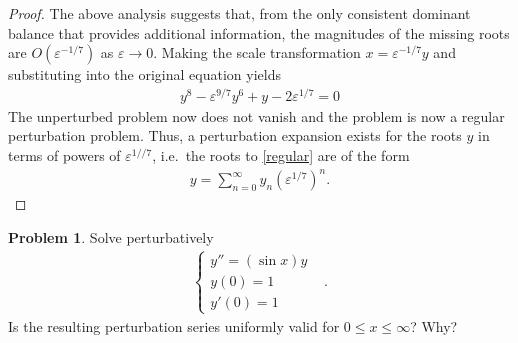 \documentclass[12pt]{article}
\theoremstyle{definition}
\newtheorem{problem}{Problem}
\begin{document}
\begin{proof}
  The above analysis suggests that, from the only consistent dominant balance that
  provides additional information, the magnitudes of the missing roots are
  $O(\varepsilon^{-1/7})$ as $\varepsilon \to 0$. Making the scale transformation
  $x = \varepsilon^{-1/7}y$ and substituting into the original equation yields
  \begin{align}\label{regular}
    y^8 - \varepsilon^{9/7}y^6 + y - 2\varepsilon^{1/7} = 0
  \end{align}
  The unperturbed problem now does not vanish and the problem is now a regular perturbation problem.
  Thus, a perturbation expansion exists for the roots $y$ in terms of powers of $\varepsilon^{1//7}$, i.e.\
  the roots to \eqref{regular} are of the form
  \begin{align*}
    y = \sum_{n=0}^\infty y_n \left(\varepsilon^{1/7}\right)^n.
  \end{align*}
\end{proof}
\newpage


\begin{problem}
  Solve perturbatively
  \begin{align*}
    \begin{cases}
      y'' = (\sin x)y &\\
      y(0) = 1 &\\
      y'(0) = 1
    \end{cases}.
  \end{align*}
  Is the resulting perturbation series uniformly valid for $0\leq x \leq \infty$? Why?
\end{problem}
\end{document}
